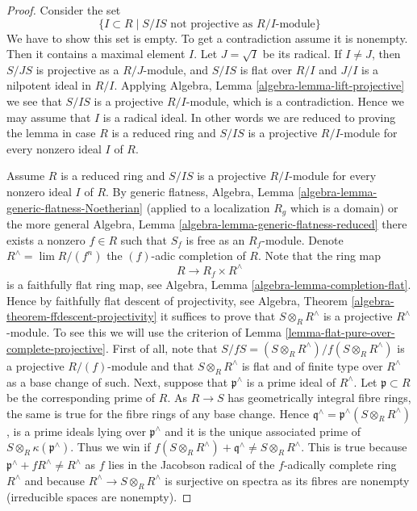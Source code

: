 \documentclass[10pt,a4paper]{amsart}
\theoremstyle{plain}
\theoremstyle{definition}
\theoremstyle{remark}
\numberwithin{equation}{subsection}
\def\lim{\mathop{\mathrm{lim}}\nolimits}
\begin{document}
\begin{proof}
Consider the set
$$
\{I \subset R \mid S/IS\text{ not projective as }R/I\text{-module}\}
$$
We have to show this set is empty. To get a contradiction assume it is
nonempty. Then it contains a maximal element $I$.
Let $J = \sqrt{I}$ be its radical. If $I \not = J$, then
$S/JS$ is projective as a $R/J$-module, and $S/IS$ is flat over $R/I$
and $J/I$ is a nilpotent ideal in $R/I$. Applying
Algebra, Lemma \ref{algebra-lemma-lift-projective}
we see that $S/IS$ is a projective $R/I$-module, which is a contradiction.
Hence we may assume that $I$ is a radical ideal. In other words we
are reduced to proving the lemma in case $R$ is a reduced ring and
$S/IS$ is a projective $R/I$-module for every nonzero ideal $I$
of $R$.

\medskip\noindent
Assume $R$ is a reduced ring and $S/IS$ is a projective $R/I$-module
for every nonzero ideal $I$ of $R$. By generic flatness,
Algebra, Lemma \ref{algebra-lemma-generic-flatness-Noetherian}
(applied to a localization $R_g$ which is a domain) or the more general
Algebra, Lemma \ref{algebra-lemma-generic-flatness-reduced}
there exists a nonzero $f \in R$ such that $S_f$ is free as an
$R_f$-module. Denote $R^\wedge = \lim R/(f^n)$ the $(f)$-adic completion
of $R$. Note that the ring map
$$
R \longrightarrow R_f \times R^\wedge
$$
is a faithfully flat ring map, see
Algebra, Lemma \ref{algebra-lemma-completion-flat}.
Hence by faithfully flat descent of projectivity, see
Algebra, Theorem \ref{algebra-theorem-ffdescent-projectivity}
it suffices to prove that $S \otimes_R R^\wedge$ is a projective
$R^\wedge$-module. To see this we will use the criterion of
Lemma \ref{lemma-flat-pure-over-complete-projective}.
First of all, note that $S/fS = (S \otimes_R R^\wedge)/f(S \otimes_R R^\wedge)$
is a projective $R/(f)$-module and that $S \otimes_R R^\wedge$ is flat
and of finite type over $R^\wedge$ as a base change of such.
Next, suppose that $\mathfrak p^\wedge$ is a prime ideal
of $R^\wedge$. Let $\mathfrak p \subset R$ be the corresponding prime
of $R$. As $R \to S$ has geometrically integral fibre rings, the
same is true for the fibre rings of any base change. Hence
$\mathfrak q^\wedge = \mathfrak p^\wedge(S \otimes_R R^\wedge)$,
is a prime ideals lying over $\mathfrak p^\wedge$
and it is the unique associated prime of
$S \otimes_R \kappa(\mathfrak p^\wedge)$. Thus we win if
$f(S \otimes_R R^\wedge) + \mathfrak q^\wedge \not = S \otimes_R R^\wedge$.
This is true because $\mathfrak p^\wedge + fR^\wedge \not = R^\wedge$ as
$f$ lies in the Jacobson radical of the $f$-adically complete ring $R^\wedge$
and because $R^\wedge \to S \otimes_R R^\wedge$ is surjective on spectra
as its fibres are nonempty (irreducible spaces are nonempty).
\end{proof}
\end{document}

